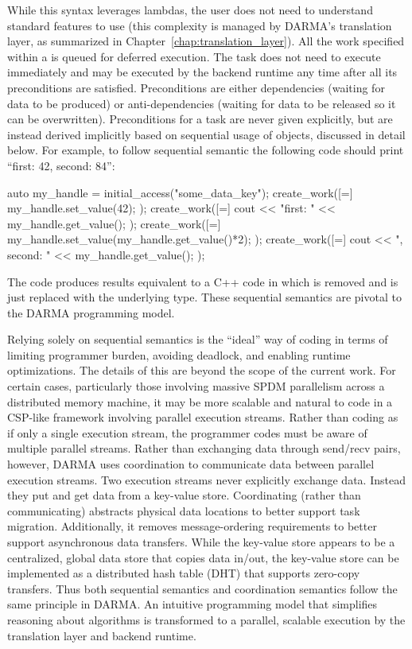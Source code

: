 While this syntax leverages  lambdas, the user does not need to understand  standard features to use  (this
complexity is managed by DARMA's translation layer, as summarized in Chapter~\ref{chap:translation_layer}). 
All the work specified within a  is queued for deferred execution. 
The task does not need to execute immediately and may be executed by the backend runtime any time after all its preconditions are satisfied. 
Preconditions are either dependencies (waiting for data to be produced) or anti-dependencies (waiting for data to be released so it can be overwritten).   
Preconditions for a task are never given explicitly, but are instead derived implicitly based on sequential usage of  objects, discussed in detail below.
For example, to follow sequential semantic the following code should print ``first: 42, second: 84'':
\begin{CppCode}
auto my_handle = initial_access("some_data_key");
create_work([=]{
  my_handle.set_value(42);
});
create_work([=]{
  cout << "first: " << my_handle.get_value();
});
create_work([=]{
  my_handle.set_value(my_handle.get_value()*2);
});
create_work([=]{
  cout << ", second: " << my_handle.get_value();
});
\end{CppCode}
The code produces results equivalent to a C++ code in which  is removed and  is just replaced with the underlying type.
These sequential semantics are pivotal to the DARMA programming model.

Relying solely on sequential semantics is the ``ideal'' way of coding in terms of limiting programmer burden, avoiding deadlock, and enabling runtime optimizations.
The details of this are beyond the scope of the current work.
For certain cases, particularly those involving massive SPDM parallelism across a distributed memory machine,
it may be more scalable and natural to code in a CSP-like framework involving parallel execution streams.
Rather than coding as if only a single execution stream, the programmer codes must be aware of multiple parallel streams.
Rather than exchanging data through send/recv pairs, however, DARMA uses coordination to communicate data between parallel execution streams.
Two execution streams never explicitly exchange data. Instead they put and get data from a key-value store.
Coordinating (rather than communicating) abstracts physical data locations to better support task migration.
Additionally, it removes message-ordering requirements to better support asynchronous data transfers.
While the key-value store appears to be a centralized, global data store that copies data in/out,
the key-value store can be implemented as a distributed hash table (DHT) that supports zero-copy transfers.
Thus both sequential semantics and coordination semantics follow the same principle in DARMA.
An intuitive programming model that simplifies reasoning about algorithms is transformed to a parallel, scalable execution by the translation layer and backend runtime.

